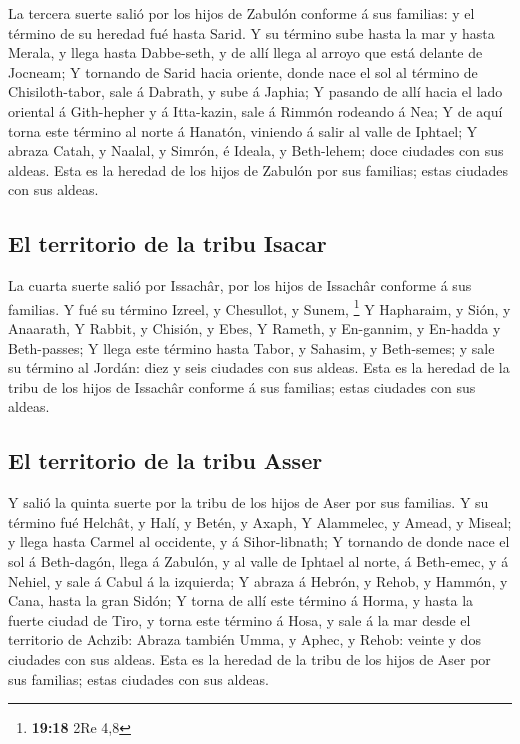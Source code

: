  La tercera suerte salió por los hijos de Zabulón
conforme á sus familias: y el término de su heredad fué hasta Sarid.
 Y su término sube hasta la mar y hasta Merala, y llega
hasta Dabbe-seth, y de allí llega al arroyo que está delante de Jocneam;
 Y tornando de Sarid hacia oriente, donde nace el sol al
término de Chisiloth-tabor, sale á Dabrath, y sube á Japhia;
 Y pasando de allí hacia el lado oriental á Gith-hepher y
á Itta-kazin, sale á Rimmón rodeando á Nea;  Y de aquí
torna este término al norte á Hanatón, viniendo á salir al valle de
Iphtael;  Y abraza Catah, y Naalal, y Simrón, é Ideala, y
Beth-lehem; doce ciudades con sus aldeas.  Esta es la
heredad de los hijos de Zabulón por sus familias; estas ciudades con sus
aldeas.

\hypertarget{el-territorio-de-la-tribu-isacar}{%
\subsection{El territorio de la tribu
Isacar}\label{el-territorio-de-la-tribu-isacar}}

 La cuarta suerte salió por Issachâr, por los hijos de
Issachâr conforme á sus familias.  Y fué su término
Izreel, y Chesullot, y Sunem, \footnote{\textbf{19:18} 2Re 4,8}
 Y Hapharaim, y Sión, y Anaarath,  Y
Rabbit, y Chisión, y Ebes,  Y Rameth, y En-gannim, y
En-hadda y Beth-passes;  Y llega este término hasta
Tabor, y Sahasim, y Beth-semes; y sale su término al Jordán: diez y seis
ciudades con sus aldeas.  Esta es la heredad de la tribu
de los hijos de Issachâr conforme á sus familias; estas ciudades con sus
aldeas.

\hypertarget{el-territorio-de-la-tribu-asser}{%
\subsection{El territorio de la tribu
Asser}\label{el-territorio-de-la-tribu-asser}}

 Y salió la quinta suerte por la tribu de los hijos de
Aser por sus familias.  Y su término fué Helchât, y Halí,
y Betén, y Axaph,  Y Alammelec, y Amead, y Miseal; y
llega hasta Carmel al occidente, y á Sihor-libnath;  Y
tornando de donde nace el sol á Beth-dagón, llega á Zabulón, y al valle
de Iphtael al norte, á Beth-emec, y á Nehiel, y sale á Cabul á la
izquierda;  Y abraza á Hebrón, y Rehob, y Hammón, y Cana,
hasta la gran Sidón;  Y torna de allí este término á
Horma, y hasta la fuerte ciudad de Tiro, y torna este término á Hosa, y
sale á la mar desde el territorio de Achzib:  Abraza
también Umma, y Aphec, y Rehob: veinte y dos ciudades con sus aldeas.
 Esta es la heredad de la tribu de los hijos de Aser por
sus familias; estas ciudades con sus aldeas.

